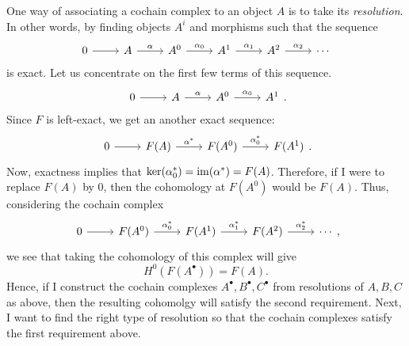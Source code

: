 One way of associating a cochain complex to an object $A$ is to take its
\emph{resolution}. In other words, by finding objects $A^{i}$ and
morphisms such that the sequence
\[\begin{tikzcd}
    0\rar & A\rar{\alpha} & A^{0}\rar{\alpha_{0}} & A^{1}\rar{\alpha_{1}}
    & A^{2}\rar{\alpha_{2}} & \cdots
  \end{tikzcd}\]
is exact. Let us concentrate on the first few terms of this sequence.
\[\begin{tikzcd}
    0\rar & A\rar{\alpha} & A^{0}\rar{\alpha_{0}} & A^{1}
  \end{tikzcd}.\]
Since $F$ is left-exact, we get an another exact sequence:
\[\begin{tikzcd}
    0\rar & F(A)\rar{\alpha^{\ast}}
    & F(A^{0})\rar{\alpha_{0}^{\ast}} & F(A^{1})
  \end{tikzcd}.\]
Now, exactness implies that $\ker(\alpha_{0}^{\ast})=\operatorname{im}(\alpha^{\ast})
=F(A)$. Therefore, if I were to replace $F(A)$ by $0$,
then the cohomology at $F(A^{0})$ would be $F(A)$.
Thus, considering the cochain complex
\[\begin{tikzcd}
    0\rar & F(A^{0})\rar{\alpha_{0}^{\ast}}
    & F(A^{1})\rar{\alpha_{1}^{\ast}}
    & F(A^{2})\rar{\alpha_{2}^{\ast}} & \cdots
  \end{tikzcd},\]
we see that taking the cohomology of this complex will give
\[H^{0}(F(A^{\bullet}))=F(A).\]
Hence, if I construct the cochain complexes $A^{\bullet},B^{\bullet},
C^{\bullet}$ from resolutions of $A,B,C$ as above, then the resulting
cohomolgy will satisfy the second requirement. Next, I want to find the right
type of resolution so that the cochain complexes satisfy the first
requirement above.

